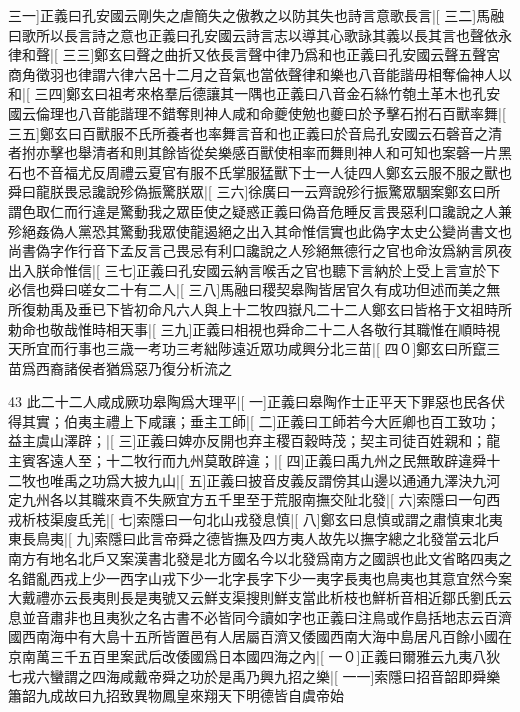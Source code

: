 三一]正義曰孔安國云剛失之虐簡失之傲教之以防其失也詩言意歌長言|[%
三二]馬融曰歌所以長言詩之意也正義曰孔安國云詩言志以導其心歌詠其義以長其言也聲依永律和聲|[%
三三]鄭玄曰聲之曲折又依長言聲中律乃爲和也正義曰孔安國云聲五聲宮商角徵羽也律謂六律六呂十二月之音氣也當依聲律和樂也八音能諧毋相奪倫神人以和|[%
三四]鄭玄曰祖考來格羣后德讓其一隅也正義曰八音金石絲竹匏土革木也孔安國云倫理也八音能諧理不錯奪則神人咸和命夔使勉也夔曰於予擊石拊石百獸率舞|[%
三五]鄭玄曰百獸服不氏所養者也率舞言音和也正義曰於音烏孔安國云石磬音之清者拊亦擊也舉清者和則其餘皆從矣樂感百獸使相率而舞則神人和可知也案磬一片黑石也不音福尤反周禮云夏官有服不氏掌服猛獸下士一人徒四人鄭玄云服不服之獸也舜曰龍朕畏忌讒說殄偽振驚朕眾|[%
三六]徐廣曰一云齊說殄行振驚眾駰案鄭玄曰所謂色取仁而行違是驚動我之眾臣使之疑惑正義曰偽音危睡反言畏惡利口讒說之人兼殄絕姦偽人黨恐其驚動我眾使龍遏絕之出入其命惟信實也此偽字太史公變尚書文也尚書偽字作行音下孟反言己畏忌有利口讒說之人殄絕無德行之官也命汝爲納言夙夜出入朕命惟信|[%
三七]正義曰孔安國云納言喉舌之官也聽下言納於上受上言宣於下必信也舜曰嗟女二十有二人|[%
三八]馬融曰稷契皋陶皆居官久有成功但述而美之無所復勅禹及垂已下皆初命凡六人與上十二牧四嶽凡二十二人鄭玄曰皆格于文祖時所勅命也敬哉惟時相天事|[%
三九]正義曰相視也舜命二十二人各敬行其職惟在順時視天所宜而行事也三歳一考功三考絀陟遠近眾功咸興分北三苗|[%
四０]鄭玄曰所竄三苗爲西裔諸侯者猶爲惡乃復分析流之

43
此二十二人咸成厥功皋陶爲大理平|[%
一]正義曰皋陶作士正平天下罪惡也民各伏得其實；伯夷主禮上下咸讓；垂主工師|[%
二]正義曰工師若今大匠卿也百工致功；益主虞山澤辟；|[%
三]正義曰婢亦反開也弃主稷百穀時茂；契主司徒百姓親和；龍主賓客遠人至；十二牧行而九州莫敢辟違；|[%
四]正義曰禹九州之民無敢辟違舜十二牧也唯禹之功爲大披九山|[%
五]正義曰披音皮義反謂傍其山邊以通通九澤決九河定九州各以其職來貢不失厥宜方五千里至于荒服南撫交阯北發|[%
六]索隱曰一句西戎析枝渠廋氐羌|[%
七]索隱曰一句北山戎發息慎|[%
八]鄭玄曰息慎或謂之肅慎東北夷東長鳥夷|[%
九]索隱曰此言帝舜之德皆撫及四方夷人故先以撫字總之北發當云北戶南方有地名北戶又案漢書北發是北方國名今以北發爲南方之國誤也此文省略四夷之名錯亂西戎上少一西字山戎下少一北字長字下少一夷字長夷也鳥夷也其意宜然今案大戴禮亦云長夷則長是夷號又云鮮支渠搜則鮮支當此析枝也鮮析音相近鄒氏劉氏云息並音肅非也且夷狄之名古書不必皆同今讀如字也正義曰注鳥或作島括地志云百濟國西南海中有大島十五所皆置邑有人居屬百濟又倭國西南大海中島居凡百餘小國在京南萬三千五百里案武后改倭國爲日本國四海之內|[%
一０]正義曰爾雅云九夷八狄七戎六蠻謂之四海咸戴帝舜之功於是禹乃興九招之樂|[%
一一]索隱曰招音韶即舜樂簫韶九成故曰九招致異物鳳皇來翔天下明德皆自虞帝始

